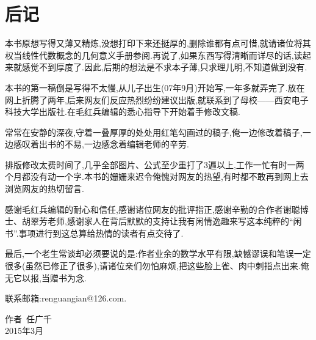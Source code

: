 \chapter*{后记}
本书原想写得又薄又精炼,没想打印下来还挺厚的,删除谁都有点可惜,就请诸位将其权当线性代数概念的几何意义手册参阅.再说了,如果东西写得清晰而详尽的话,读起来就感觉不到厚度了.因此,后期的想法是不求本子薄,只求理儿明,不知道做到没有.

本书的第一稿倒是写得不太慢,从儿子出生(07年9月)开始写,一年多就弄完了.放在网上折腾了两年,后来网友们反应热烈纷纷建议出版,就联系到了母校——西安电子科技大学出版社.在毛红兵编辑的悉心指导下开始着手修改文稿.

常常在安静的深夜,守着一叠厚厚的处处用红笔勾画过的稿子,俺一边修改着稿子,一边感叹着出书的不易,一边感念着编辑老师的辛劳.

排版修改太费时间了,几乎全部图片、公式至少重打了3遍以上,工作一忙有时一两个月都没有动一个字.本书的姗姗来迟令俺愧对网友的热望,有时都不敢再到网上去浏览网友的热切留言.

感谢毛红兵编辑的耐心和信任,感谢诸位网友的批评指正,感谢辛勤的合作者谢聪博士、胡翠芳老师,感谢家人在背后默默的支持让我有闲情逸趣来写这本纯粹的``闲书''.事项进行到这总算给热情的读者有点交待了.

最后,一个老生常谈却必须要说的是:作者业余的数学水平有限,缺憾谬误和笔误一定很多(虽然已修正了很多),请诸位亲们勿怕麻烦,把这些脸上雀、肉中刺指点出来.俺无它以报,当赠书为念.

联系邮箱:renguangian@126.com.
\begin{flushright}
    \begin{minipage}[c][1cm][c]{3cm}
        \centering
        作者~任广千\\
        2015年3月
    \end{minipage}
\end{flushright}